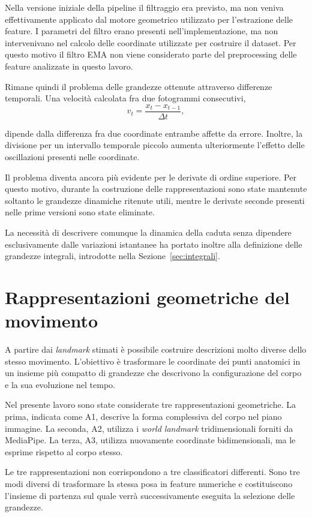 Nella versione iniziale della pipeline il filtraggio era previsto, ma non veniva effettivamente applicato dal motore geometrico utilizzato per l'estrazione delle feature. I parametri del filtro erano presenti nell'implementazione, ma non intervenivano nel calcolo delle coordinate utilizzate per costruire il dataset. Per questo motivo il filtro EMA non viene considerato parte del preprocessing delle feature analizzate in questo lavoro.

Rimane quindi il problema delle grandezze ottenute attraverso differenze temporali. Una velocità calcolata fra due fotogrammi consecutivi,
\[
v_t = \frac{x_t-x_{t-1}}{\Delta t},
\]

dipende dalla differenza fra due coordinate entrambe affette da errore. Inoltre, la divisione per un intervallo temporale piccolo aumenta ulteriormente l'effetto delle oscillazioni presenti nelle coordinate.

Il problema diventa ancora più evidente per le derivate di ordine superiore. Per questo motivo, durante la costruzione delle rappresentazioni sono state mantenute soltanto le grandezze dinamiche ritenute utili, mentre le derivate seconde presenti nelle prime versioni sono state eliminate.

La necessità di descrivere comunque la dinamica della caduta senza dipendere esclusivamente dalle variazioni istantanee ha portato inoltre alla definizione delle grandezze integrali, introdotte nella Sezione~\ref{sec:integrali}.

\section{Rappresentazioni geometriche del movimento}
\label{sec:rappresentazioni}

A partire dai \emph{landmark} stimati è possibile costruire descrizioni molto diverse dello stesso movimento. L'obiettivo è trasformare le coordinate dei punti anatomici in un insieme più compatto di grandezze che descrivono la configurazione del corpo e la sua evoluzione nel tempo.

Nel presente lavoro sono state considerate tre rappresentazioni geometriche.
La prima, indicata come A1, descrive la forma complessiva del corpo nel piano immagine. La seconda, A2, utilizza i \emph{world landmark} tridimensionali forniti da MediaPipe. La terza, A3, utilizza nuovamente coordinate bidimensionali, ma le esprime rispetto al corpo stesso.

Le tre rappresentazioni non corrispondono a tre classificatori differenti. Sono tre modi diversi di trasformare la stessa posa in feature numeriche e costituiscono l'insieme di partenza sul quale verrà successivamente eseguita la selezione delle grandezze.

